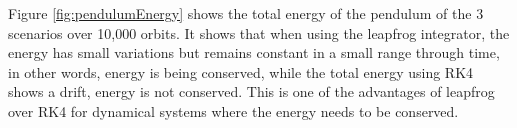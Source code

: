 Figure \ref{fig:pendulumEnergy} shows the total energy of the pendulum of the 3 scenarios over 10,000 orbits. It shows that when using the leapfrog integrator, the energy has small variations but remains constant in a small range through time, in other words, energy is being conserved, while the total energy using RK4 shows a drift, energy is not conserved. This is one of the advantages of leapfrog over RK4 for dynamical systems where the energy needs to be conserved.

\clearpage